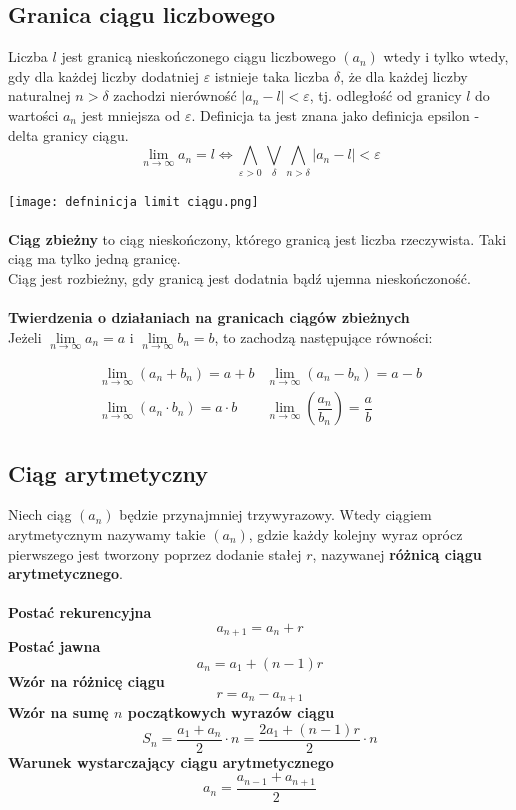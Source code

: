 \documentclass[14pt,a4paper]{extarticle}
\begin{document}
\subsection{Granica ciągu liczbowego}
Liczba $l$ jest granicą nieskończonego ciągu liczbowego $(a_{n})$ wtedy i tylko wtedy, gdy dla
każdej liczby dodatniej $\varepsilon$ istnieje taka liczba $\delta$, że dla każdej liczby naturalnej
$n > \delta$ zachodzi nierówność $\vert a_{n} - l\vert < \varepsilon$, tj. odległość od granicy $l$ do
wartości $a_{n}$ jest mniejsza od $\varepsilon$. Definicja ta jest znana jako definicja epsilon - delta granicy ciągu.\\
$$\lim_{n\to \infty}a_{n} = l \Leftrightarrow \underset{\varepsilon > 0}{\bigwedge} \underset{\delta}{\bigvee} \underset{n > \delta}{\bigwedge} \vert a_{n} - l\vert < \varepsilon$$

\noindent\texttt{[image: defninicja limit ciągu.png]}\\\\
\noindent\textbf{Ciąg zbieżny} to ciąg nieskończony, którego granicą jest liczba rzeczywista.
Taki ciąg ma tylko jedną granicę.\\
Ciąg jest rozbieżny, gdy granicą jest dodatnia bądź ujemna nieskończoność.\\\\

\noindent\textbf{Twierdzenia o działaniach na granicach ciągów zbieżnych}\\
Jeżeli $\underset{n \to \infty}{\lim}a_{n} = a$ i $\underset{n \to \infty}{\lim}b_{n} = b$, to zachodzą następujące równości:
{%

\renewcommand{\arraycolsep}{1cm}
\renewcommand{\arraystretch}{1.8}

\begin{equation*}
\begin{array}{cc}
   \underset{n \to \infty}{\lim}(a_{n} + b_{n}) = a + b & \underset{n \to \infty}{\lim}(a_{n} - b_{n}) = a - b\\
   \underset{n \to \infty}{\lim}(a_{n}\cdot b_{n}) = a\cdot b & \underset{n \to \infty}{\lim}\left(\dfrac{a_{n}}{b_{n}}\right) = \dfrac{a}{b}
\end{array}
\end{equation*}
}%

\newpage

\subsection{Ciąg arytmetyczny}
\noindent Niech ciąg $(a_{n})$ będzie przynajmniej trzywyrazowy. Wtedy ciągiem arytmetycznym nazywamy takie $(a_{n})$,
gdzie każdy kolejny wyraz oprócz pierwszego jest tworzony poprzez dodanie stałej $r$, nazywanej \textbf{różnicą ciągu arytmetycznego}.\\\\
\noindent\textbf{Postać rekurencyjna}
$$a_{n+1} = a_{n} + r$$
\noindent\textbf{Postać jawna}
$$a_{n} = a_{1} + (n - 1)r$$
\noindent\textbf{Wzór na różnicę ciągu}
$$r = a_{n} - a_{n+1}$$
\noindent\textbf{Wzór na sumę $n$ początkowych wyrazów ciągu}
$$S_{n} = \dfrac{a_{1} + a_{n}}{2}\cdot n = \dfrac{2a_{1} + (n - 1)r}{2}\cdot n$$
\noindent\textbf{Warunek wystarczający ciągu arytmetycznego}
$$a_{n} = \dfrac{a_{n-1}+a_{n+1}}{2}$$
\end{document}
